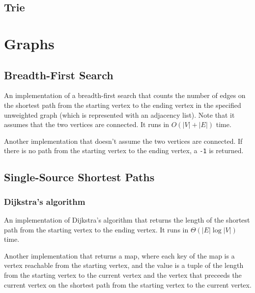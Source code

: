 \documentclass[10pt,a4paper,titlepage]{article}
\begin{document}
		\subsection{Trie}
			

	\section{Graphs}

		\subsection{Breadth-First Search}

			An implementation of a breadth-first search that counts the number of edges on the shortest path from the starting vertex to the ending vertex in the specified unweighted graph (which is represented with an adjacency list). Note that it assumes that the two vertices are connected. It runs in $O(|V|+|E|)$ time.
			

			Another implementation that doesn't assume the two vertices are connected. If there is no path from the starting vertex to the ending vertex, a \lstinline$-1$ is returned.
			


		\subsection{Single-Source Shortest Paths}
			\subsubsection{Dijkstra's algorithm}
				An implementation of Dijkstra's algorithm that returns the length of the shortest path from the starting vertex to the ending vertex. It runs in $\Theta(|E|\log{|V|})$ time.
				

				Another implementation that returns a map, where each key of the map is a vertex reachable from the starting vertex, and the value is a tuple of the length from the starting vertex to the current vertex and the vertex that preceeds the current vertex on the shortest path from the starting vertex to the current vertex.
				
\end{document}
